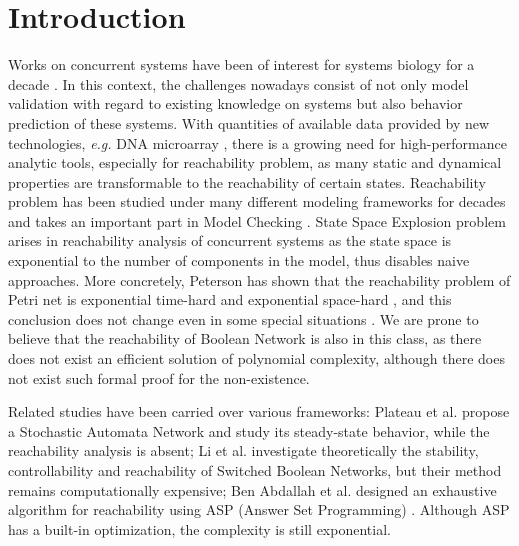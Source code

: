 \documentclass[runningheads]{llncs}
\begin{document}
\section{Introduction}
\label{intro}
Works on concurrent systems have been of interest for systems biology for a decade \cite{bockmayr2002using,bortolussi2008modeling,wiley2003computational}. 
In this context, the challenges nowadays consist of not only model validation with regard to existing knowledge on systems but also behavior prediction of these systems. 
With quantities of available data provided by new technologies, \textit{e.g.} DNA microarray \cite{marx2013}, there is a growing need for high-performance analytic tools, especially for reachability problem, as many static and dynamical properties are transformable to the reachability of certain states. Reachability problem has been studied under many different modeling frameworks for decades \cite{akutsu2007control,barrett2006complexity,Daws1998,esparza1998,mayr1984,wozna2003} and takes an important part in Model Checking \cite{clarke20142}. 
State Space Explosion problem arises in reachability analysis of concurrent systems as the state space is exponential to the number of components in the model, thus disables naive approaches. 
More concretely, Peterson has shown that the reachability problem of Petri net is exponential time-hard and exponential space-hard \cite{peterson1977petri}, and this conclusion does not change even in some special situations \cite{esparza1998}. 
We are prone to believe that the reachability of Boolean Network is also in this class, as there does not exist an efficient solution of polynomial complexity, although there does not exist such formal proof for the non-existence.

Related studies have been carried over various frameworks: Plateau et al. \cite{plateau1991stochastic} propose a Stochastic Automata Network and study its steady-state behavior, while the reachability analysis is absent; Li et al. \cite{li2012reachability,li2014stability} investigate theoretically the stability, controllability and reachability of Switched Boolean Networks, but their method remains computationally expensive; Ben Abdallah et al. \cite{abdallah2015exhaustive} designed an exhaustive algorithm for reachability using ASP (Answer Set Programming) \cite{baral2003knowledge}.
Although ASP has a built-in optimization, the complexity is still exponential. 
\end{document}
